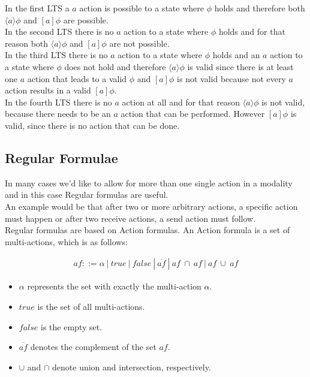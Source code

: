 \documentclass{clseminar}
\begin{document}
  In the first LTS a $a$ action is possible to a state where $\phi$ holds and therefore both $\langle{}a\rangle{}\phi$ and $[a]\phi$ are possible. \\
  In the second LTS there is no $a$ action to a state where $\phi$ holds and for that reason both $\langle{}a\rangle{}\phi$ and $[a]\phi$ are not possible. \\
  In the third LTS there is no $a$ action to a state where $\phi$ holds and an $a$ action to a state where $\phi$ does not hold and therefore $\langle{}a\rangle{}\phi$ is valid since there is at least one $a$ action that leads to a valid $\phi$ and $[a]\phi$ is not valid because not every $a$ action results in a valid $[a]\phi$. \\
  In the fourth LTS there is no $a$ action at all and for that reason $\langle{}a\rangle{}\phi$ is not valid, because there needs to be an $a$ action that can be performed. However $[a]\phi$ is valid, since there is no action that can be done.

  \subsection{Regular Formulae}

  In many cases we'd like to allow for more than one single action in a modality and in this case Regular formulas are useful. \\
  An example would be that after two or more arbitrary actions, a specific action must happen or after two receive actions, a send action must follow. \\
  Regular formulas are based on Action formulas. An Action formula is a set of multi-actions, which is as follows:

  \pagebreak
  \begin{align*}
    \mathit{af} ::= \alpha\ |\ \mathit{true}\ |\ \mathit{false}\ |\ \overline{\mathit{af}}\ |\ \mathit{af}\ \cap\ \mathit{af}\ |\ \mathit{af}\ \cup\ \mathit{af}
  \end{align*}

  \begin{itemize}
    \item $\alpha$ represents the set with exactly the multi-action $\alpha$.
    \item $\mathit{true}$ is the set of all multi-actions.
    \item $\mathit{false}$ is the empty set.
    \item $\overline{\mathit{af}}$ denotes the complement of the set $\mathit{af}$.
    \item $\cup$ and $\cap$ denote union and intersection, respectively.
  \end{itemize}
\end{document}
